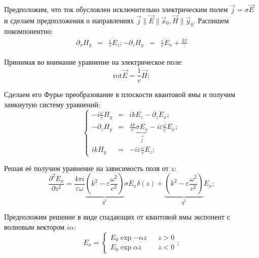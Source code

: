 \documentclass[../main.tex]{subfiles}
\newcommand{\rot}{\text{rot}}
\begin{document}
    Предположим, что ток обусловлен исключительно электрическим полем
    $\vec j  = \sigma \vec E$ и сделаем предположения о направлениях 
    $\vec j \parallel \vec E \parallel \vec{x}_0, \vec H \parallel \vec{y}_0$.
    Распишем покомпонентно:
    \begin{equation}
        \begin{aligned}
            \partial_x H_y &=& \frac{\varepsilon}{c} \dot{E}_z;
            -\partial_z H_y &=& \frac{\varepsilon}{c} \dot{E}_x + \frac{4\pi };
        \end{aligned}
    \end{equation}

    Принимая во внимание уравнение на электрическое поле:
    \begin{equation}
        \rot \vec E = \frac{1}{c} \dot \vec H;
    \end{equation}

    Сделаем его Фурье преобразование в плоскости квантовой ямы
    и получим замкнутую систему уравнений:
    \begin{equation}
        \left\{
        \begin{aligned}
            - i \frac{\omega}{c} H_y &=& i k E_z - \partial_z E_x;\\
            - \partial_z H_y  &=& \frac{4\pi}{c} \underbrace{\sigma E_x}_{\vec j} 
            - i \varepsilon  \frac{\omega}{c} E_x;\\
            ik H_y  &=& - i \varepsilon \frac{\omega}{c} E_z;
        \end{aligned}
        \right.
    \end{equation}

    Решая её получим уравнение на зависимость поля от $z$:
    \begin{equation}
        \frac{\partial^2 E_x}{\partial z^2} = \frac{4\pi i}{\varepsilon \omega}
        \underbrace{\left(k^2  - \varepsilon \frac{\omega^2}{c^2}\right)}_{q^2} \sigma E_x \delta(z)
        + \underbrace{\left(k^2  - \varepsilon \frac{\omega^2}{c^2}\right)}_{q^2} E_x;
    \end{equation}

    Предположим решение в виде спадающих от квантовой ямы экспонент
    с волновым вектором $i\alpha$:
    \begin{equation*}
        E_x = \left\{
            \begin{aligned}
                E_0 \exp{-\alpha z} & &z > 0\\
                E_0 \exp{\alpha z} & &z < 0
            \end{aligned}
        \right.;
    \end{equation*}
\end{document}
